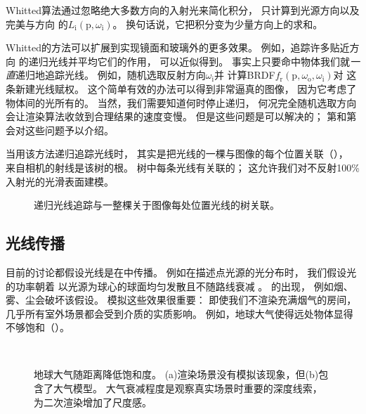 Whitted算法通过忽略绝大多数方向的入射光来简化积分，
只计算到光源方向以及
完美与方向
的$L_{\mathrm{i}}(\mathrm{p},\omega_\mathrm{i})$。
换句话说，它把积分变为少量方向上的求和。

Whitted的方法可以扩展到实现镜面和玻璃外的更多效果。
例如，追踪许多贴近方向
的递归光线并平均它们的作用，
可以近似得到。
事实上只要命中物体我们就\emph{一直}递归地追踪光线。
例如，随机选取反射方向$\omega_\mathrm{i}$并
计算BRDF$f_{\mathrm{r}}(\mathrm{p},\omega_\mathrm{o},\omega_\mathrm{i})$对
这条新建光线赋权。
这个简单有效的办法可以得到非常逼真的图像，
因为它考虑了物体间的光所有的。
当然，我们需要知道何时停止递归，
何况完全随机选取方向会让渲染算法收敛到合理结果的速度变慢。
但是这些问题是可以解决的；
第和第会对这些问题予以介绍。

当用该方法递归追踪光线时，
其实是把光线的一棵与图像的每个位置关联（），
来自相机的射线是该树的根。
树中每条光线有关联的；
这允许我们对不反射100\%入射光的光滑表面建模。
\begin{figure}
      \centering
      \caption{递归光线追踪与一整棵关于图像每处位置光线的树关联。}\label{fig:1.8}
\end{figure}

\subsection{光线传播}\label{sub:光线传播}

目前的讨论都假设光线是在中传播。
例如在描述点光源的光分布时，
我们假设光的功率朝着
以光源为球心的球面均匀发散且不随路线衰减
。
的出现，
例如烟、雾、尘会破坏该假设。
模拟这些效果很重要：
即使我们不渲染充满烟气的房间，
几乎所有室外场景都会受到介质的实质影响。
例如，地球大气使得远处物体显得不够饱和（）。
\begin{figure}
      \centering
      \\
      \caption{地球大气随距离降低饱和度。
            (a)渲染场景没有模拟该现象，但(b)包含了大气模型。
            大气衰减程度是观察真实场景时重要的深度线索，
            为二次渲染增加了尺度感。}
      \label{fig:1.9}
\end{figure}

